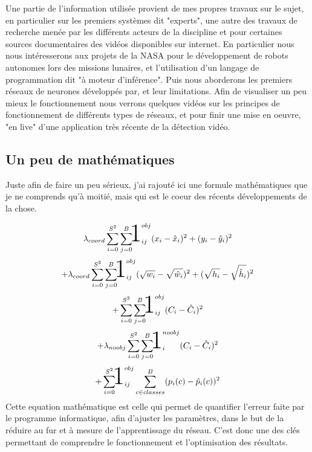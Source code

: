\documentclass[a0,landscape]{a0poster}
\def\one{\mbox{1\hspace{-9.75pt}\fontsize{30}{5}\selectfont\textrm{1}}} %
\begin{document}
\begin{multicols}{4}
Une partie de l'information utilisée provient de mes propres travaux sur le sujet, en particulier sur les premiers systèmes dit "experts", une autre des travaux de recherche menée par les différents acteurs de la discipline et pour certaines sources documentaires des vidéos disponibles sur internet.
En particulier nous nous intéresserons aux projets de la NASA pour le développement de robots autonomes lors des missions lunaires, et l'utilisation d'un langage de programmation dit "à moteur d'inférence". Puis nous aborderons les premiers réseaux de neurones développés par, et leur limitations. Afin de visualiser un peu mieux le fonctionnement nous verrons quelques vidéos sur les principes de fonctionnement de différents types de réseaux, et pour finir une mise en oeuvre, "en live" d'une application très récente de la détection vidéo.

\subsection*{Un peu de mathématiques}

Juste afin de faire un peu sérieux, j'ai rajouté ici une formule mathématiques que je ne comprends qu'à moitié, mais qui est le coeur des récents développements de la chose.

$$  \lambda_{coord}\sum_{i=0}^{S^2}\sum_{j=0}^{B} \one_{ij}^{obj} (x_i-\hat{x}_i)^2 + (y_i-\hat{y}_i)^2 $$
$$+ \lambda_{coord}\sum_{i=0}^{S^2}\sum_{j=0}^{B} \one_{ij}^{obj} (\sqrt{w_i}-\sqrt{\hat{w}_i})^2 + (\sqrt{h_i}-\sqrt{\hat{h}_i})^2 $$
$$+ \sum_{i=0}^{S^2}\sum_{j=0}^{B} \one_{ij}^{obj} (C_i-\hat{C}_i)^2 $$
$$+ \lambda_{noobj}\sum_{i=0}^{S^2}\sum_{j=0}^{B} \one_{i}^{noobj} (C_i-\hat{C}_i)^2 $$
$$+ \sum_{i=0}^{S^2} \one_{ij}^{obj} \sum_{c \in classes}^{B} (p_i(c)-\hat{p}_i(c))^2 $$
Cette equation mathématique est celle qui permet de quantifier l'erreur faite par le programme informatique, afin d'ajuster les paramètres, dans le but de la réduire au fur et à mesure de l'apprentissage du réseau. C'est donc une des clés permettant de comprendre le fonctionnement et l'optimisation des résultats.



\end{multicols}
\end{document}
